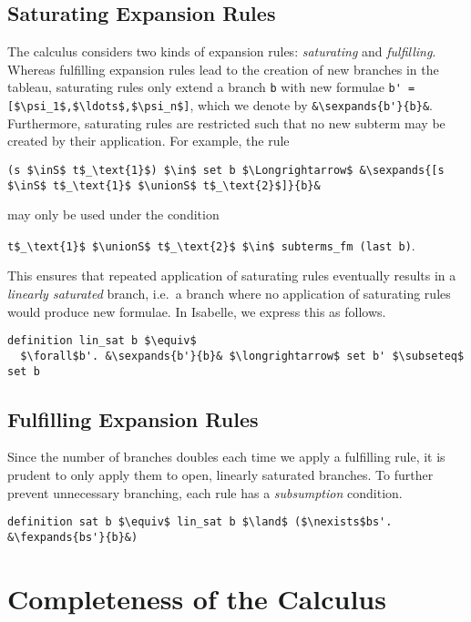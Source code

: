 \documentclass[sigplan,10pt,anonymous,review]{acmart}
\newcommand{\lefttrianglebar}{\mathrel{\tikz[baseline]{\draw (1ex, 0.75ex) -- (0, 1.25ex) -- (0, 0.25ex) -- cycle; \draw (0, 0.75ex) -- (1ex, 0.75ex);}}}
\newcommand{\lefttriangle}{\mathrel{\tikz[baseline]{\draw (1ex, 0.75ex) -- (0, 1.25ex) -- (0, 0.25ex) -- cycle;}}}
\newcommand{\sexpands}[2]{#1 $\lefttriangle$ #2}
\newcommand{\fexpands}[2]{#1 $\lefttrianglebar$ #2}
\newcommand{\unionS}{\sqcup_\text{s}}
\newcommand{\inS}{\in_\text{s}}
\begin{document}
\subsection{Saturating Expansion Rules}
The calculus considers two kinds of expansion rules: \textit{saturating} and \textit{fulfilling}.
Whereas fulfilling expansion rules lead to the creation of new branches in the tableau, saturating rules only extend a branch \lstinline!b! with new formulae \lstinline[breaklines=true]!b' = [$\psi_1$,$\ldots$,$\psi_n$]!, which we denote by \lstinline!&\sexpands{b'}{b}&!.
Furthermore, saturating rules are restricted such that no new subterm may be created by their application.
For example, the rule
\begin{center}
\lstinline!(s $\inS$ t$_\text{1}$) $\in$ set b $\Longrightarrow$ &\sexpands{[s $\inS$ t$_\text{1}$ $\unionS$ t$_\text{2}$]}{b}&!
\end{center}
may only be used under the condition
\begin{center}
  \lstinline!t$_\text{1}$ $\unionS$ t$_\text{2}$ $\in$ subterms_fm (last b)!.
\end{center}
This ensures that repeated application of saturating rules eventually results in a \textit{linearly saturated} branch, i.e.\ a branch where no application of saturating rules would produce new formulae.
In Isabelle, we express this as follows.
\begin{lstlisting}
definition lin_sat b $\equiv$
  $\forall$b'. &\sexpands{b'}{b}& $\longrightarrow$ set b' $\subseteq$ set b
\end{lstlisting}

\subsection{Fulfilling Expansion Rules\label{sec:fulfilling}}
Since the number of branches doubles each time we apply a fulfilling rule, it is prudent to only apply them to open, linearly saturated branches. 
To further prevent unnecessary branching, each rule has a \textit{subsumption} condition. 

\begin{lstlisting}
definition sat b $\equiv$ lin_sat b $\land$ ($\nexists$bs'. &\fexpands{bs'}{b}&)
\end{lstlisting}

\section{Completeness of the Calculus}
\end{document}
